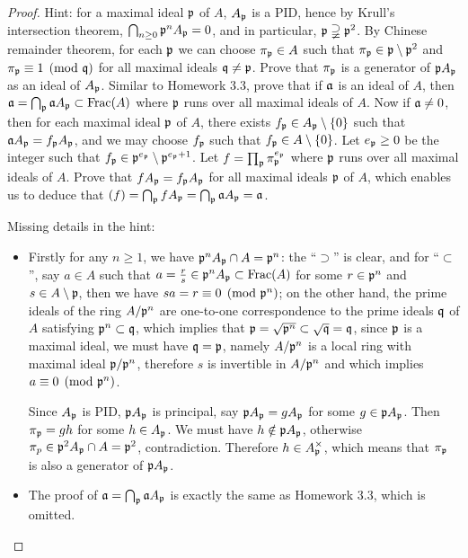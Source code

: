 \iffalse
\begin{proof}
Hint: for a maximal ideal
${\mathfrak{p}}$ of $A$, $A_{\mathfrak{p}}$ is a PID, hence by Krull's intersection theorem,
$\bigcap_{n\geq 0}{\mathfrak{p}}^nA_{\mathfrak{p}}=0$,
and in particular, ${\mathfrak{p}}\supsetneqq{\mathfrak{p}}^2$. By Chinese remainder theorem,
for each ${\mathfrak{p}}$ we can choose $\pi_{\mathfrak{p}}\in A$ such that
$\pi_{\mathfrak{p}}\in{\mathfrak{p}}\setminus{\mathfrak{p}}^2$ and $\pi_{\mathfrak{p}}\equiv 1\pmod{{\mathfrak{q}}}$
for all maximal ideals ${\mathfrak{q}}\neq{\mathfrak{p}}$.
Prove that $\pi_{\mathfrak{p}}$ is a generator of ${\mathfrak{p}} A_{\mathfrak{p}}$ as an ideal of $A_{\mathfrak{p}}$.
Similar to Homework 3.3,
prove that if ${\mathfrak{a}}$ is an ideal of $A$, then
${\mathfrak{a}}=\bigcap_{\mathfrak{p}}{\mathfrak{a}} A_{\mathfrak{p}}\subset{\mathrm{Frac}}(A)$ where ${\mathfrak{p}}$ runs over all maximal ideals
of $A$.
Now if ${\mathfrak{a}}\neq 0$, then for each maximal ideal ${\mathfrak{p}}$ of $A$,
there exists $f_{\mathfrak{p}}\in A_{\mathfrak{p}}\setminus\{0\}$ such that ${\mathfrak{a}} A_{\mathfrak{p}}=f_{\mathfrak{p}} A_{\mathfrak{p}}$,
and we may choose $f_{\mathfrak{p}}$ such that $f_{\mathfrak{p}}\in A\setminus\{0\}$.
Let $e_{\mathfrak{p}}\geq 0$
be the integer such that $f_{\mathfrak{p}}\in{\mathfrak{p}}^{e_{\mathfrak{p}}}\setminus{\mathfrak{p}}^{e_{\mathfrak{p}}+1}$.
Let $f=\prod_{\mathfrak{p}}\pi_{\mathfrak{p}}^{e_{\mathfrak{p}}}$ where ${\mathfrak{p}}$ runs over all maximal ideals
of $A$.
Prove that $fA_{\mathfrak{p}}=f_{\mathfrak{p}} A_{\mathfrak{p}}$ for all maximal ideals ${\mathfrak{p}}$ of $A$,
which enables us to deduce that $(f)=\bigcap_{\mathfrak{p}} fA_{\mathfrak{p}}=\bigcap_{\mathfrak{p}}{\mathfrak{a}} A_{\mathfrak{p}}
={\mathfrak{a}}$.

Missing details in the hint:
\begin{itemize}
\item
Firstly for any $n\geq 1$, we have ${\mathfrak{p}}^nA_{\mathfrak{p}}\cap A={\mathfrak{p}}^n$: the ``$\supset$''
is clear, and for ``$\subset$'', say $a\in A$ such that
$a=\frac{r}{s}\in{\mathfrak{p}}^nA_{\mathfrak{p}}\subset{\mathrm{Frac}}(A)$ for some $r\in{\mathfrak{p}}^n$ and $s\in A\setminus{\mathfrak{p}}$,
then we have $sa=r\equiv 0\pmod{{\mathfrak{p}}^n}$;
on the other hand, the prime ideals of the ring $A/{\mathfrak{p}}^n$ are one-to-one correspondence to the prime ideals ${\mathfrak{q}}$ of $A$ satisfying ${\mathfrak{p}}^n\subset{\mathfrak{q}}$,
which implies that ${\mathfrak{p}}=\sqrt{{\mathfrak{p}}^n}\subset\sqrt{{\mathfrak{q}}}={\mathfrak{q}}$, since ${\mathfrak{p}}$ is a maximal ideal,
we must have ${\mathfrak{q}}={\mathfrak{p}}$, namely $A/{\mathfrak{p}}^n$ is a local ring with maximal ideal
${\mathfrak{p}}/{\mathfrak{p}}^n$, therefore $s$ is invertible in $A/{\mathfrak{p}}^n$ and which implies
$a\equiv 0\pmod{{\mathfrak{p}}^n}$.

Since $A_{\mathfrak{p}}$ is PID, ${\mathfrak{p}} A_{\mathfrak{p}}$ is principal, say ${\mathfrak{p}} A_{\mathfrak{p}}=gA_{\mathfrak{p}}$
for some $g\in{\mathfrak{p}} A_{\mathfrak{p}}$.
Then $\pi_{\mathfrak{p}}=gh$ for some $h\in A_{\mathfrak{p}}$.
We must have $h\notin{\mathfrak{p}} A_{\mathfrak{p}}$, otherwise $\pi_p\in{\mathfrak{p}}^2 A_{\mathfrak{p}}\cap A={\mathfrak{p}}^2$, contradiction. Therefore $h\in A_{\mathfrak{p}}^\times$, which means that $\pi_{\mathfrak{p}}$ is also a generator of ${\mathfrak{p}} A_{\mathfrak{p}}$.

\item
The proof of ${\mathfrak{a}}=\bigcap_{\mathfrak{p}}{\mathfrak{a}} A_{\mathfrak{p}}$ is exactly the same as
Homework 3.3, which is omitted.


\end{itemize}
\end{proof}
